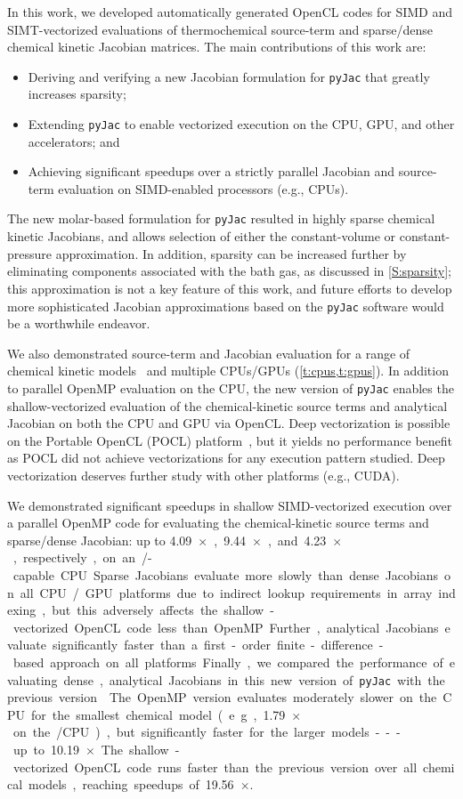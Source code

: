 \documentclass[12pt,number,sort&compress,preprint]{elsarticle}
\begin{document}
In this work, we developed automatically generated OpenCL codes for SIMD and SIMT-vectorized evaluations of thermochemical source-term and sparse\slash dense chemical kinetic Jacobian matrices.
The main contributions of this work are:
\begin{itemize}
 \item Deriving and verifying a new Jacobian formulation for \texttt{pyJac} that greatly increases sparsity;
 \item Extending \texttt{pyJac} to enable vectorized execution on the CPU, GPU, and other accelerators; and
 \item Achieving significant speedups over a strictly parallel Jacobian and source-term evaluation on SIMD-enabled processors (e.g., CPUs).
\end{itemize}

The new molar-based formulation for \texttt{pyJac} resulted in highly sparse chemical kinetic Jacobians,
and allows selection of either the constant-volume or constant-pressure approximation.
In addition, sparsity can be increased further by eliminating components associated with the bath gas, as discussed in \cref{S:sparsity};
this approximation is not a key feature of this work, and future efforts to develop more sophisticated Jacobian approximations based on the \texttt{pyJac} software would be a worthwhile endeavor.

We also demonstrated source-term and Jacobian evaluation for a range of chemical kinetic models~\cite{Burke:2011fh,smith_gri-mech_30,Wang:2007,Sarathy:2013jr} and multiple CPUs\slash GPUs (\cref{t:cpus,t:gpus}).
In addition to parallel OpenMP evaluation on the CPU, the new version of \texttt{pyJac} enables the shallow-vectorized evaluation of the chemical-kinetic source terms and analytical Jacobian on both the CPU and GPU via OpenCL.
Deep vectorization is possible on the Portable OpenCL (POCL) platform~\cite{poclIJPP}, but it yields no performance benefit as POCL did not achieve vectorizations for any execution pattern studied.
Deep vectorization deserves further study with other platforms (e.g., CUDA).

We demonstrated significant speedups in shallow SIMD-vectorized execution over a parallel OpenMP code for evaluating the chemical-kinetic source terms and sparse\slash dense Jacobian: up to \SI{4.09}{$\times$}, \SI{9.44}{$\times$}, and \SI{4.23}{$\times$}, respectively, on an \avx/-capable CPU.
Sparse Jacobians evaluate more slowly than dense Jacobians on all CPU\slash GPU platforms due to indirect lookup requirements in array indexing, but this adversely affects the shallow-vectorized OpenCL code less than OpenMP.
Further, analytical Jacobians evaluate significantly faster than a first-order finite-difference-based approach on all platforms.
Finally, we compared the performance of evaluating dense, analytical Jacobians in this new version of \texttt{pyJac} with the previous version~\cite{pyjac16}.
The OpenMP version evaluates moderately slower on the CPU for the smallest chemical model (e.g., \SI{1.79}{$\times$} on the \avx/ CPU), but significantly faster for the larger models---up to \SI{10.19}{$\times$}.
The shallow-vectorized OpenCL code runs faster than the previous version over all chemical models, reaching speedups of \SI{19.56}{$\times$}.
\end{document}
